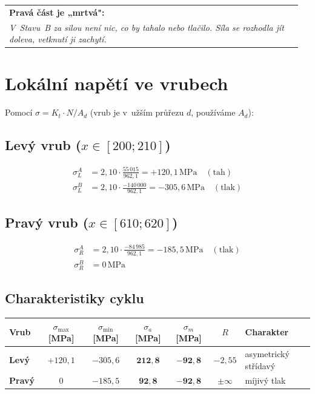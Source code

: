 \documentclass[a4paper,11pt]{article}
\makeatletter
\newcommand{\unit}[1]{\,\mathrm{#1}}
\newenvironment{poznamka}[1][Poznámka]{%
    \par\medskip\noindent\begin{tabular}{@{}|p{0.96\linewidth}@{}}\hline
    \textbf{#1:}\\[-0.4ex]\itshape\ignorespaces}{%
    \\\hline\end{tabular}\par\medskip}
\makeatother
\begin{document}
\begin{poznamka}[Pravá část je „mrtvá"]
V~Stavu~B za silou není nic, co by tahalo nebo tlačilo. Síla se rozhodla jít doleva, vetknutí ji zachytí.
\end{poznamka}

\section{Lokální napětí ve vrubech}

Pomocí $\sigma = K_t \cdot N/A_d$ (vrub je v~užším průřezu $d$, používáme $A_d$):

\subsection{Levý vrub ($x \in [200; 210]$)}

\begin{align}
\sigma_L^{A} &= 2{,}10\cdot \frac{55\,015}{962{,}1} = \boxed{+120{,}1\unit{MPa}}\quad (\text{tah}) \\
\sigma_L^{B} &= 2{,}10\cdot \frac{-140\,000}{962{,}1} = \boxed{-305{,}6\unit{MPa}}\quad (\text{tlak})
\end{align}

\subsection{Pravý vrub ($x \in [610; 620]$)}

\begin{align}
\sigma_R^{A} &= 2{,}10\cdot \frac{-84\,985}{962{,}1} = \boxed{-185{,}5\unit{MPa}}\quad (\text{tlak}) \\
\sigma_R^{B} &= 0\unit{MPa}
\end{align}

\subsection{Charakteristiky cyklu}

\begin{table}[H]
\centering
\small
\begin{tabular}{lcccccp{3.5cm}}
\toprule
\textbf{Vrub} & $\sigma_{\max}$ [MPa] & $\sigma_{\min}$ [MPa] & $\sigma_a$ [MPa] & $\sigma_m$ [MPa] & $R$ & \textbf{Charakter} \\
\midrule
\textbf{Levý}  & $+120{,}1$ & $-305{,}6$ & $\mathbf{212{,}8}$ & $\mathbf{-92{,}8}$ & $-2{,}55$ & asymetrický střídavý \\
\textbf{Pravý} & $0$        & $-185{,}5$ & $\mathbf{92{,}8}$  & $\mathbf{-92{,}8}$ & $\pm\infty$ & míjivý tlak \\
\bottomrule
\end{tabular}
\end{table}
\end{document}
